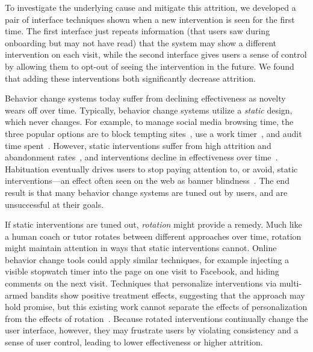 To investigate the underlying cause and mitigate this attrition, we developed a pair of interface techniques shown when a new intervention is seen for the first time. The first interface just repeats information (that users saw during onboarding but may not have read) that the system may show a different intervention on each visit, while the second interface gives users a sense of control by allowing them to opt-out of seeing the intervention in the future. We found that adding these interventions both significantly decrease attrition.

Behavior change systems today suffer from declining effectiveness as novelty wears off over time. Typically, behavior change systems utilize a \textit{static} design, which never changes. For example, to manage social media browsing time, the three popular options are to block tempting sites~\cite{stayfocusd}, use a work timer~\cite{focusbooster}, and audit time spent~\cite{khovanskaya2013everybody,rescuetimeapp}. However, static interventions suffer from high attrition and abandonment rates~\cite{collins2014social,eysenbach2005law}, and interventions decline in effectiveness over time~\cite{krebs2010meta}. Habituation eventually drives users to stop paying attention to, or avoid, static interventions---an effect often seen on the web as banner blindness~\cite{benway1998banner}. The end result is that many behavior change systems are tuned out by users, and are unsuccessful at their goals.

If static interventions are tuned out, \textit{rotation} might provide a remedy. Much like a human coach or tutor rotates between different approaches over time, rotation might maintain attention in ways that static interventions cannot. Online behavior change tools could apply similar techniques, for example injecting a visible stopwatch timer into the page on one visit to Facebook, and hiding comments on the next visit.
Techniques that personalize interventions via multi-armed bandits show positive treatment effects, suggesting that the approach may hold promise, but this existing work cannot separate the effects of personalization from the effects of rotation~\cite{rabbi2015automated, lei2017actor, paredes2014poptherapy}. %
Because rotated interventions continually change the user interface, however, they may frustrate users by violating consistency and a sense of user control, leading to lower effectiveness or higher attrition. %

